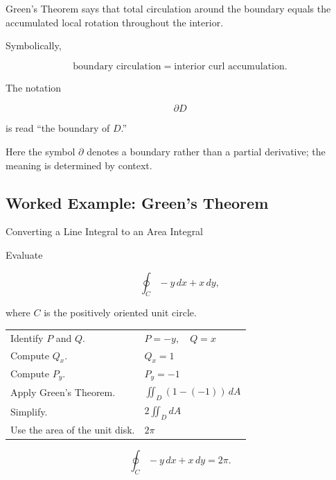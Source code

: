 Green's Theorem says that total circulation around the boundary equals the
accumulated local rotation throughout the interior.

Symbolically,

\[ \boxed{\text{boundary circulation}
=
\text{interior curl accumulation}.} \]

\begin{center}
\end{center}

The notation

\[ \partial D \]

is read ``the boundary of \(D\).''

Here the symbol \(\partial\) denotes a boundary rather than a partial
derivative; the meaning is determined by context.

\subsection{Worked Example: Green's Theorem}
\label{subsec:worked-greens-theorem}

\begin{workedexamplebox}{Converting a Line Integral to an Area Integral}

Evaluate

\[ \oint_C -y\,dx+x\,dy, \]

where \(C\) is the positively oriented unit circle.

\begin{tabularx}{\textwidth}{@{}>{\raggedright\arraybackslash}p{}X@{}}
Identify \(P\) and \(Q\). &
\(P=-y,\quad Q=x\)\\
Compute \(Q_x\). &
\(Q_x=1\)\\
Compute \(P_y\). &
\(P_y=-1\)\\
Apply Green's Theorem. &
\(\displaystyle \iint_D(1-(-1))\,dA\)\\
Simplify. &
\(\displaystyle 2\iint_DdA\)\\
Use the area of the unit disk. &
\(2\pi\)
\end{tabularx}

\begin{answerbox}
\[ \boxed{\oint_C -y\,dx+x\,dy=2\pi.} \]
\end{answerbox}
\end{workedexamplebox}

